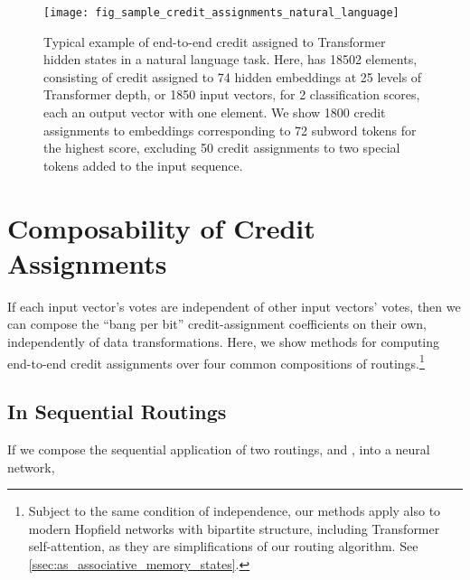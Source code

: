 \documentclass[11pt,a4paper]{article}
\begin{document}
\begin{figure*}[t]
	\vskip 0.1in
	\begin{center}
		\centerline{\texttt{[image: fig\_sample\_credit\_assignments\_natural\_language]}}
		\caption{Typical example of end-to-end credit assigned to Transformer hidden states in a natural language task. Here,  has 18502 elements, consisting of credit assigned to 74 hidden embeddings at 25 levels of Transformer depth, or 1850 input vectors, for 2 classification scores, each an output vector with one element. We show 1800 credit assignments to embeddings corresponding to 72 subword tokens for the highest score, excluding 50 credit assignments to two special tokens added to the input sequence.}
		\label{fig:sample_credit_assignments_natural_language}
	\end{center}
	\vskip -0.2in
\end{figure*}


\cleardoublepage





\cleardoublepage


\appendix


\section{Composability of Credit Assignments}\label{app:composability_of_credit_assignments}

If each input vector's votes are independent of other input vectors' votes, then we can compose the ``bang per bit'' credit-assignment coefficients  on their own, independently of data transformations. Here, we show methods for computing end-to-end credit assignments over four common compositions of routings.\footnote{Subject to the same condition of independence, our methods apply also to modern Hopfield networks with bipartite structure, including Transformer self-attention, as they are simplifications of our routing algorithm. See \ref{ssec:as_associative_memory_states}.}


\subsection{In Sequential Routings}

If we compose the sequential application of two routings,  and , into a neural network,
\end{document}

